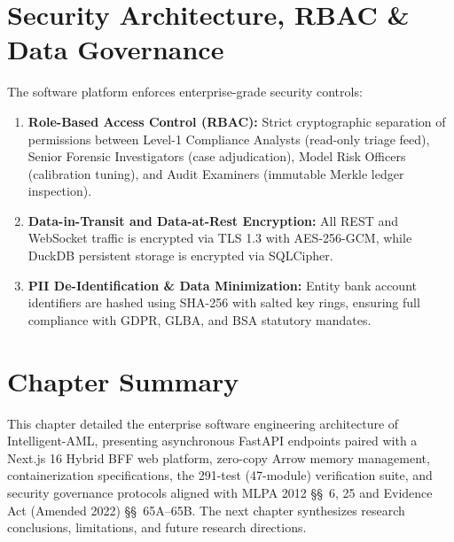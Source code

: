 \section{Security Architecture, RBAC \& Data Governance}
The software platform enforces enterprise-grade security controls:
\begin{enumerate}
    \item \textbf{Role-Based Access Control (RBAC):} Strict cryptographic separation of permissions between Level-1 Compliance Analysts (read-only triage feed), Senior Forensic Investigators (case adjudication), Model Risk Officers (calibration tuning), and Audit Examiners (immutable Merkle ledger inspection).
    \item \textbf{Data-in-Transit and Data-at-Rest Encryption:} All REST and WebSocket traffic is encrypted via TLS 1.3 with AES-256-GCM, while DuckDB persistent storage is encrypted via SQLCipher.
    \item \textbf{PII De-Identification \& Data Minimization:} Entity bank account identifiers are hashed using SHA-256 with salted key rings, ensuring full compliance with GDPR, GLBA, and BSA statutory mandates.
\end{enumerate}

\FloatBarrier
\section{Chapter Summary}
This chapter detailed the enterprise software engineering architecture of Intelligent-AML, presenting asynchronous FastAPI endpoints paired with a Next.js 16 Hybrid BFF web platform, zero-copy Arrow memory management, containerization specifications, the 291-test (47-module) verification suite, and security governance protocols aligned with MLPA 2012 \S\S~6, 25 and Evidence Act (Amended 2022) \S\S~65A--65B. The next chapter synthesizes research conclusions, limitations, and future research directions.
